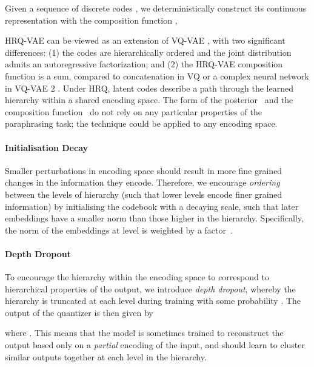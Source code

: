 \documentclass[11pt]{article}
\begin{document}
Given a sequence of discrete codes , we deterministically construct its continuous representation with the composition function ,



HRQ-VAE can be viewed as an extension of VQ-VAE \cite{vqvae}, with two
significant differences: (1) the codes are hierarchically ordered and
the joint distribution  admits an autoregressive
factorization; and (2) the HRQ-VAE composition function is a sum,
compared to concatenation in VQ or a complex neural network in VQ-VAE 2 \cite{vqvae2}. Under HRQ, latent codes describe
a path through the learned hierarchy within a shared encoding space. The form of the posterior~ and the composition function~ do not rely on any particular
properties of the paraphrasing task; the technique could be applied to
any encoding space.











\paragraph{Initialisation Decay} Smaller perturbations in encoding space should result in more fine grained changes in the information they encode. Therefore, we encourage \textit{ordering} between the levels of hierarchy (such that lower levels encode finer grained information) by initialising the codebook with a decaying scale, such that later embeddings have a smaller norm than those higher in the hierarchy. Specifically, the norm of the embeddings at level  is weighted by a factor~.



\paragraph{Depth Dropout} To encourage the hierarchy within the encoding space to correspond to hierarchical properties of the output, we introduce \textit{depth dropout}, whereby the hierarchy is truncated at each level during training with some probability . The output of the quantizer is then given by 

where . This means that the model is sometimes trained to reconstruct the output based only on a \textit{partial} encoding of the input, and should learn to cluster similar outputs together at each level in the hierarchy.
\end{document}
